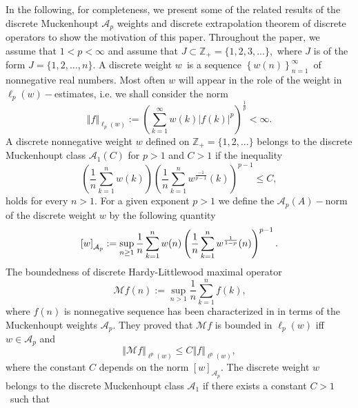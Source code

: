 \documentclass[a4paper]{amsart}
\theoremstyle{plain}
\numberwithin{equation}{section}
\begin{document}
In the following, for completeness, we present some of the related results
of the discrete Muckenhoupt $\mathcal{A}_{p}$ weights and discrete
extrapolation theorem of discrete operators to show the motivation of this
paper. Throughout the paper, we assume that $1<p<\infty $ and assume that $J%
\mathbb{\subset Z}_{+}=\{1,2,3,...\},$ where $J$ is of the form $%
J=\{1,2,\ldots ,n\}$. A discrete weight $w$\ is a sequence $\left\{
w(n)\right\} _{n=1}^{\infty }$\ of nonnegative real numbers. Most often $w$
will appear in the role of the weight in $\ell _{p}(w)-$estimates, i.e. we
shall consider the norm 
\begin{equation*}
\left\Vert f\right\Vert _{\ell _{p}(w)}:=\left( \sum_{k=1}^{\infty
}w(k)\left\vert f(k)\right\vert ^{p}\right) ^{\frac{1}{p}}<\infty .
\end{equation*}%
A discrete nonnegative weight $w$ defined on $\mathbb{Z}_{+}=\{1,2,\ldots \}$
belongs to the discrete Muckenhoupt class $\mathcal{A}_{1}(C)$ for $p>1$ and 
$C>1$ if the inequality 
\begin{equation}
\left( \frac{1}{n}\sum\limits_{k=1}^{n}{w(k)}\right) {\left( \frac{1}{n}%
\sum\limits_{k=1}^{n}w^{\frac{-1}{p-1}}(k)\right) ^{p-1}}\leq C,  \label{Ap1}
\end{equation}%
holds for every $n>1.$ For a given exponent $p>1$ we define the $\mathcal{A}%
_{p}(A)-$norm of the discrete weight $w$ by the following quantity%
\begin{equation*}
\left[ w\right] _{\mathcal{A}_{p}}:=\sup_{n\geq 1}\frac{1}{n}%
\sum\limits_{k=1}^{n}w(n)\left( \frac{1}{n}\sum\limits_{k=1}^{n}w^{\frac{1}{%
1-p}}(n)\right) ^{p-1}.
\end{equation*}%
The boundedness of discrete Hardy-Littlewood maximal operator 
\begin{equation}
\mathcal{M}f(n):=\sup_{n>1}\frac{1}{n}\sum\limits_{k=1}^{n}f(k)\text{,}
\label{3.1}
\end{equation}%
where $f(n)$ is nonnegative sequence has been characterized in \cite%
{Saker2020} in terms of the Muckenhoupt weights $\mathcal{A}_{p}$. They
proved that $\mathcal{M}f$ is bounded in $\ell _{p}(w)$ iff $w\in \mathcal{A}%
_{p}$ and 
\begin{equation*}
\left\Vert \mathcal{M}f\right\Vert _{\ell ^{p}(w)}\leq C\left\Vert
f\right\Vert _{\ell ^{p}(w)},
\end{equation*}%
where the constant $C$ depends on the norm $[w]_{\mathcal{A}_{p}}.$ The
discrete weight $w$ belongs to the discrete Muckenhoupt class $\mathcal{A}%
_{1}$ if there exists a constant $C>1$\ such that 
\end{document}
